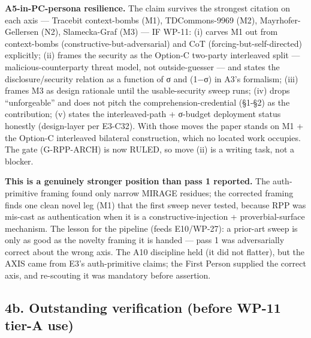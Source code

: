 \documentclass[
  11pt,
]{article}
\begin{document}
\textbf{A5-in-PC-persona resilience.} The claim survives the strongest
citation on each axis --- Tracebit context-bombs (M1), TDCommons-9969
(M2), Mayrhofer-Gellersen (N2), Slamecka-Graf (M3) --- IF WP-11: (i)
carves M1 out from context-bombs (constructive-but-adversarial) and CoT
(forcing-but-self-directed) explicitly; (ii) frames the security as the
Option-C two-party interleaved split --- malicious-counterparty threat
model, not outside-guesser --- and states the disclosure/security
relation as a function of σ and (1−σ) in A3's formalism; (iii) frames M3
as design rationale until the usable-security sweep runs; (iv) drops
``unforgeable'' and does not pitch the comprehension-credential (§1-§2)
as the contribution; (v) states the interleaved-path + σ-budget
deployment status honestly (design-layer per E3-C32). With those moves
the paper stands on M1 + the Option-C interleaved bilateral
construction, which no located work occupies. The gate (G-RPP-ARCH) is
now RULED, so move (ii) is a writing task, not a blocker.

\textbf{This is a genuinely stronger position than pass 1 reported.} The
auth-primitive framing found only narrow MIRAGE residues; the corrected
framing finds one clean novel leg (M1) that the first sweep never
tested, because RPP was mis-cast as authentication when it is a
constructive-injection + proverbial-surface mechanism. The lesson for
the pipeline (feeds E10/WP-27): a prior-art sweep is only as good as the
novelty framing it is handed --- pass 1 was adversarially correct about
the wrong axis. The A10 discipline held (it did not flatter), but the
AXIS came from E3's auth-primitive claims; the First Person supplied the
correct axis, and re-scouting it was mandatory before assertion.

\subsection{4b. Outstanding verification (before WP-11 tier-A
use)}\label{b.-outstanding-verification-before-wp-11-tier-a-use}
\end{document}
